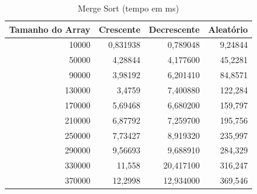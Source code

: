 \documentclass[a4paper, 12pt]{article}
\begin{document}
	\begin{longtable}[c]{@{}rrrr@{}}
		\caption{Merge Sort (tempo em ms)}
		\label{tab:merge1-table}\\
		\toprule
		\multicolumn{1}{l}{\textbf{Tamanho do Array}} & \multicolumn{1}{l}{\textbf{Crescente}} & \multicolumn{1}{l}{\textbf{Decrescente}} & \multicolumn{1}{l}{\textbf{Aleatório}} \\* \midrule
		\endfirsthead
		\endhead
		\multicolumn{1}{|r|}{10000}                   & \multicolumn{1}{r|}{0,831938}          & \multicolumn{1}{r|}{0,789048}            & \multicolumn{1}{r|}{9,24844}           \\* \midrule
		\multicolumn{1}{|r|}{50000}                   & \multicolumn{1}{r|}{4,28844}           & \multicolumn{1}{r|}{4,177600}            & \multicolumn{1}{r|}{45,2281}           \\* \midrule
		\multicolumn{1}{|r|}{90000}                   & \multicolumn{1}{r|}{3,98192}           & \multicolumn{1}{r|}{6,201410}            & \multicolumn{1}{r|}{84,8571}           \\* \midrule
		\multicolumn{1}{|r|}{130000}                  & \multicolumn{1}{r|}{3,4759}            & \multicolumn{1}{r|}{7,400880}            & \multicolumn{1}{r|}{122,284}           \\* \midrule
		\multicolumn{1}{|r|}{170000}                  & \multicolumn{1}{r|}{5,69468}           & \multicolumn{1}{r|}{6,680200}            & \multicolumn{1}{r|}{159,797}           \\* \midrule
		\multicolumn{1}{|r|}{210000}                  & \multicolumn{1}{r|}{6,87792}           & \multicolumn{1}{r|}{7,259700}            & \multicolumn{1}{r|}{195,756}           \\* \midrule
		\multicolumn{1}{|r|}{250000}                  & \multicolumn{1}{r|}{7,73427}           & \multicolumn{1}{r|}{8,919320}            & \multicolumn{1}{r|}{235,997}           \\* \midrule
		\multicolumn{1}{|r|}{290000}                  & \multicolumn{1}{r|}{9,56693}           & \multicolumn{1}{r|}{9,688910}            & \multicolumn{1}{r|}{284,329}           \\* \midrule
		\multicolumn{1}{|r|}{330000}                  & \multicolumn{1}{r|}{11,558}            & \multicolumn{1}{r|}{20,417100}           & \multicolumn{1}{r|}{316,247}           \\* \midrule
		\multicolumn{1}{|r|}{370000}                  & \multicolumn{1}{r|}{12,2998}           & \multicolumn{1}{r|}{12,934000}           & \multicolumn{1}{r|}{369,546}           \\* \midrule

\end{longtable}
\end{document}
